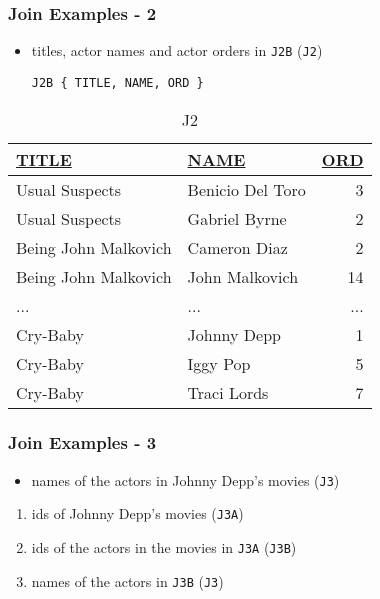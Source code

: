 \documentclass[dvipsnames]{beamer}
\theoremstyle{plain}
\begin{document}
\begin{frame}[fragile]
  \frametitle{Join Examples - 2}

  \begin{itemize}
    \item titles, actor names and actor orders in \texttt{J2B}
      (\texttt{J2})
    \begin{lstlisting}
J2B { TITLE, NAME, ORD }
    \end{lstlisting}
  \end{itemize}

  \vspace{-10pt}
  \begin{tiny}
  \begin{table}
    \caption{J2}
    \begin{tabular}{|l|l|r|}\hline
\underline{TITLE}    & \underline{NAME} & \underline{ORD}\\[2pt]\hline\hline
Usual Suspects       & Benicio Del Toro &   3\\\hline
Usual Suspects       & Gabriel Byrne    &   2\\\hline
Being John Malkovich & Cameron Diaz     &   2\\\hline
Being John Malkovich & John Malkovich   &  14\\\hline
...                  & ...              & ...\\\hline
Cry-Baby             & Johnny Depp      &   1\\\hline
Cry-Baby             & Iggy Pop         &   5\\\hline
Cry-Baby             & Traci Lords      &   7\\\hline
    \end{tabular}
  \end{table}
  \end{tiny}
\end{frame}

\begin{frame}
  \frametitle{Join Examples - 3}

  \begin{itemize}
    \item names of the actors in Johnny Depp's movies (\texttt{J3})
  \end{itemize}

  \pause
  \begin{enumerate}
    \item ids of Johnny Depp's movies (\texttt{J3A})
    \item ids of the actors in the movies in \texttt{J3A} (\texttt{J3B})
    \item names of the actors in \texttt{J3B} (\texttt{J3})
  \end{enumerate}
\end{frame}
\end{document}
